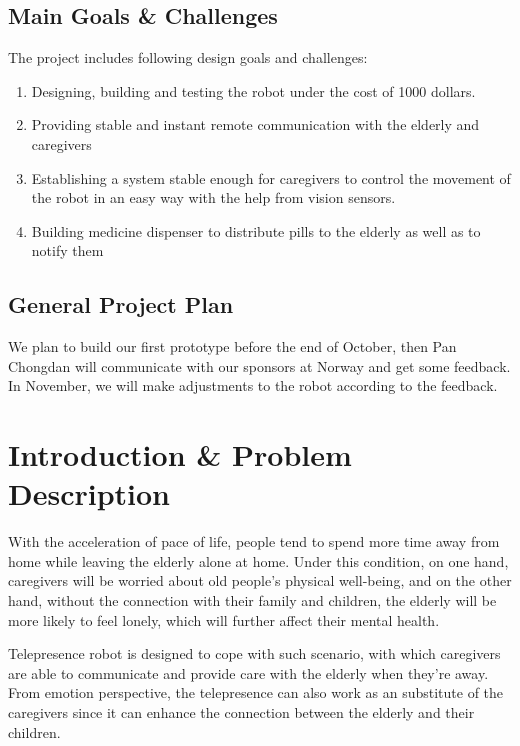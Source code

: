 \documentclass[12pt]{article}
\begin{document}
\subsection{Main Goals \& Challenges} 
\par The project includes following design goals and challenges:
\begin{enumerate}[-]
\item Designing, building and testing the robot under the cost of 1000 dollars.
\item Providing stable and instant remote communication with the elderly and caregivers 
\item Establishing a system stable enough for caregivers to control the movement of the robot in an easy way with the help from vision sensors.
\item Building medicine dispenser to distribute pills to the elderly as well as to notify them
\end{enumerate}
\subsection{General Project Plan}
We plan to build our first prototype before the end of October, then Pan Chongdan will communicate with our sponsors at Norway and get some feedback. In November, we will make adjustments to the robot according to the feedback.
\section{Introduction \& Problem Description }
With the acceleration of pace of life, people tend to spend more time away from home while leaving the elderly alone at home. Under this condition, on one hand, caregivers will be worried about old people's physical well-being, and on the other hand, without the connection with their family and children, the elderly will be more likely to feel lonely, which will further affect their mental health.\par
Telepresence robot is designed to cope with such scenario, with which caregivers are able to communicate and provide care with the elderly when they're away. From emotion perspective, the telepresence can also work as an substitute of the caregivers since it can enhance the connection between the elderly and their children.
\end{document}
